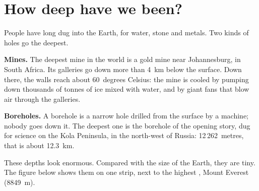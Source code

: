 \section{How deep have we been?}

People have long dug into the Earth, for water, stone
and metals. Two kinds of holes go the deepest.

\textbf{Mines.} The deepest mine in the world is a gold mine near
Johannesburg, in South Africa. Its galleries go down more than 4~km below
the surface. Down there, the  walls reach about 60~degrees Celsius:
the mine is cooled by pumping down thousands of tonnes of ice mixed with
water, and by giant fans that blow air through the galleries.

\textbf{Boreholes.} A borehole is a narrow hole drilled from the surface
by a machine; nobody goes down it. The deepest one is the borehole of the
opening story, dug for science on the Kola Peninsula, in the north-west of Russia:
12\,262~metres, that is about 12.3~km.

These depths look enormous. Compared with the size of the Earth, they are
tiny. The figure below shows them on one strip, next to the highest
, Mount Everest (8849~m).

